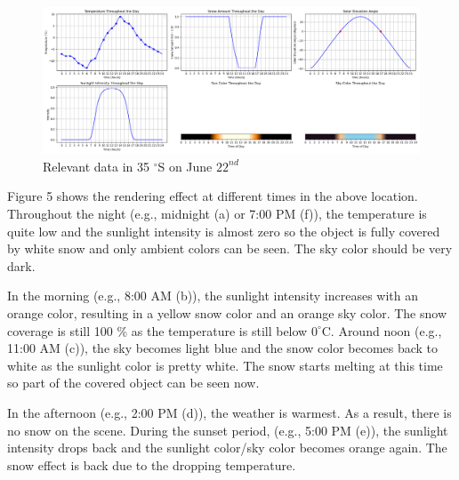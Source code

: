 \documentclass{article}
\begin{document}
\begin{figure}[h]
  \centering
  \begin{minipage}{1.00\textwidth}
      \centering
      \includegraphics[width=\textwidth]{images/Plot35N.png}
      \caption{Relevant data in 35 $^{\circ}$S on June \(22^{nd}\)}
      \label{fig:Plot35N}
  \end{minipage}
\end{figure}

Figure 5 shows the rendering effect at different times in the above location. Throughout the night (e.g., midnight (a) or 7:00 PM (f)), 
the temperature is quite low and the sunlight intensity is almost zero so the object is fully covered by white snow and only ambient 
colors can be seen. The sky color should be very dark.

In the morning (e.g., 8:00 AM (b)), the sunlight intensity increases with an orange color, resulting in a yellow snow color and an 
orange sky color. The snow coverage is still 100 \% as the temperature is still below \(0^\circ\mathrm{C}\). Around noon (e.g., 11:00 
AM (c)), the sky becomes light blue and the snow color becomes back to white as the sunlight color is pretty white. The snow starts 
melting at this time so part of the covered object can be seen now. 

In the afternoon (e.g., 2:00 PM (d)), the weather is warmest. As a result, there is no snow on the scene. During the sunset period, 
(e.g., 5:00 PM (e)), the sunlight intensity drops back and the sunlight color/sky color becomes orange again. The snow effect is back 
due to the dropping temperature.
\end{document}

